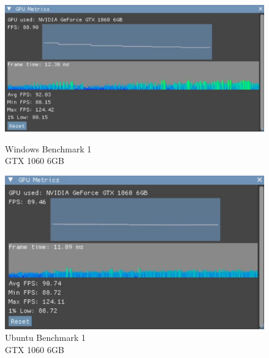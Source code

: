 \begin{figure}[ht]
    \centering
    \begin{minipage}[b]{0.48\textwidth}
        \centering
        \includegraphics[width=\textwidth]{images/windows-1.png}
        \caption{Windows Benchmark 1 \\ \hspace*{6em} GTX 1060 6GB}
        \label{fig:1060-windows-test-1}
    \end{minipage}
    \hfill
    \begin{minipage}[b]{0.40\textwidth}
        \centering
        \includegraphics[width=\textwidth]{images/linux-1.png}
        \caption{Ubuntu Benchmark 1 \\ \hspace*{6em} GTX 1060 6GB}
        \label{fig:1060-linux-test-1}
    \end{minipage}
\end{figure}

